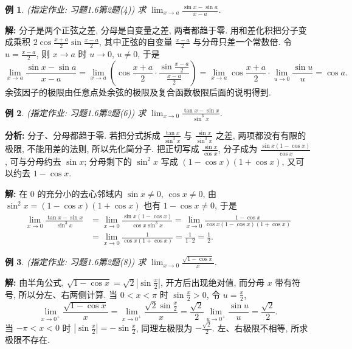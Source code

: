 \documentclass[UTF8,openany]{ctexbook}
\theoremstyle{chinesetextbook}
\newtheorem{example}{例}[section]
\newenvironment{cnsolution}{\par\indent\textbf{解:} \ignorespaces}{\par}
\begin{document}
\begin{example}
\textnormal{(指定作业: 习题1.6第2题(4))} 求 $\displaystyle\lim_{x\to a}\frac{\sin x-\sin a}{x-a}$.
\end{example}
\begin{cnsolution}
分子是两个正弦之差, 分母是自变量之差, 两者都趋于零. 用和差化积把分子变成乘积 $\displaystyle2\cos\frac{x+a}2\sin\frac{x-a}2$, 其中正弦的自变量 $\displaystyle\frac{x-a}2$ 与分母只差一个常数倍. 令 $\displaystyle u=\frac{x-a}2$, 则 $x\to a$ 时 $u\to0$, $u\ne0$, 于是
\[
\lim_{x\to a}\frac{\sin x-\sin a}{x-a}=\lim_{x\to a}\left(\cos\frac{x+a}2\cdot\frac{\sin\frac{x-a}2}{\frac{x-a}2}\right)=\lim_{x\to a}\cos\frac{x+a}2\cdot\lim_{u\to0}\frac{\sin u}u=\cos a.
\]
余弦因子的极限由任意点处余弦的极限及复合函数极限后面的说明得到.
\end{cnsolution}
\begin{example}
\textnormal{(指定作业: 习题1.6第2题(6))} 求 $\displaystyle\lim_{x\to0}\frac{\tan x-\sin x}{\sin^3x}$.
\end{example}
\par\indent\textbf{分析:} 分子、分母都趋于零. 若把分式拆成 $\displaystyle\frac{\tan x}{\sin^3x}$ 与 $\displaystyle\frac{\sin x}{\sin^3x}$ 之差, 两项都没有有限的极限, 不能用差的法则, 所以先化简分子. 把正切写成 $\displaystyle\frac{\sin x}{\cos x}$, 分子成为 $\displaystyle\frac{\sin x(1-\cos x)}{\cos x}$, 可与分母约去 $\sin x$; 分母剩下的 $\sin^2x$ 写成 $(1-\cos x)(1+\cos x)$, 又可以约去 $1-\cos x$.
\begin{cnsolution}
在 $0$ 的充分小的去心邻域内 $\sin x\ne0$, $\cos x\ne0$, 由 $\sin^2x=(1-\cos x)(1+\cos x)$ 也有 $1-\cos x\ne0$, 于是
\[
\begin{aligned}
\lim_{x\to0}\frac{\tan x-\sin x}{\sin^3x}
&=\lim_{x\to0}\frac{\sin x(1-\cos x)}{\cos x\sin^3x}=\lim_{x\to0}\frac{1-\cos x}{\cos x(1-\cos x)(1+\cos x)}\\
&=\lim_{x\to0}\frac1{\cos x(1+\cos x)}=\frac1{1\cdot2}=\frac12.
\end{aligned}
\]
\end{cnsolution}
\begin{example}
\textnormal{(指定作业: 习题1.6第2题(8))} 求 $\displaystyle\lim_{x\to0}\frac{\sqrt{1-\cos x}}x$.
\end{example}
\begin{cnsolution}
由半角公式, $\displaystyle\sqrt{1-\cos x}=\sqrt2\left|\sin\frac x2\right|$, 开方后出现绝对值, 而分母 $x$ 带有符号, 所以分左、右两侧计算. 当 $0<x<\pi$ 时 $\displaystyle\sin\frac x2>0$, 令 $\displaystyle u=\frac x2$,
\[
\lim_{x\to0^+}\frac{\sqrt{1-\cos x}}x=\lim_{x\to0^+}\frac{\sqrt2\sin\frac x2}x=\frac{\sqrt2}2\lim_{u\to0^+}\frac{\sin u}u=\frac{\sqrt2}2.
\]
当 $-\pi<x<0$ 时 $\displaystyle\left|\sin\frac x2\right|=-\sin\frac x2$, 同理左极限为 $\displaystyle-\frac{\sqrt2}2$. 左、右极限不相等, 所求极限不存在.
\end{cnsolution}
\end{document}
